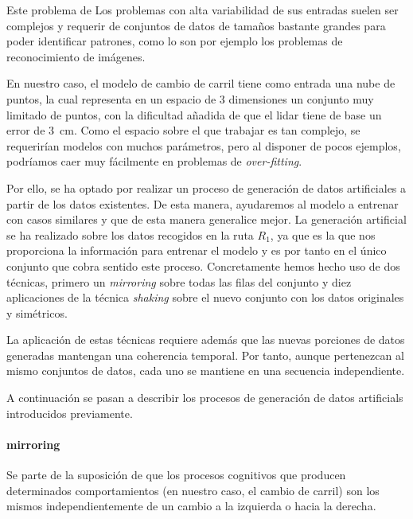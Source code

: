 Este problema de Los problemas con alta variabilidad de sus entradas suelen ser complejos y requerir de conjuntos de datos de tamaños bastante grandes para poder identificar patrones, como lo son por ejemplo los problemas de reconocimiento de imágenes.

En nuestro caso, el modelo de cambio de carril tiene como entrada una nube de puntos, la cual representa en un espacio de 3 dimensiones un conjunto muy limitado de puntos, con la dificultad añadida de que el \ac{lidar} tiene de base un error de \SI{3}{\cm}. Como el espacio sobre el que trabajar es tan complejo, se requerirían modelos con muchos parámetros, pero al disponer de pocos ejemplos, podríamos caer muy fácilmente en problemas de \textit{over-fitting}.

Por ello, se ha optado por realizar un proceso de generación de datos artificiales a partir de los datos existentes. De esta manera, ayudaremos al modelo a entrenar con casos similares y que de esta manera generalice mejor. La generación artificial se ha realizado sobre los datos recogidos en la ruta $R_1$, ya que es la que nos proporciona la información para entrenar el modelo y es por tanto en el único conjunto que cobra sentido este proceso. Concretamente hemos hecho uso de dos técnicas, primero un \textit{mirroring} sobre todas las filas del conjunto y diez aplicaciones de la técnica \textit{shaking} sobre el nuevo conjunto con los datos originales y simétricos.

La aplicación de estas técnicas requiere además que las nuevas porciones de datos generadas mantengan una coherencia temporal. Por tanto, aunque pertenezcan al mismo conjuntos de datos, cada uno se mantiene en una secuencia independiente.

A continuación se pasan a describir los procesos de generación de datos artificials introducidos previamente.

\paragraph{mirroring}

Se parte de la suposición de que los procesos cognitivos que producen determinados comportamientos (en nuestro caso, el cambio de carril) son los mismos independientemente de un cambio a la izquierda o hacia la derecha.

